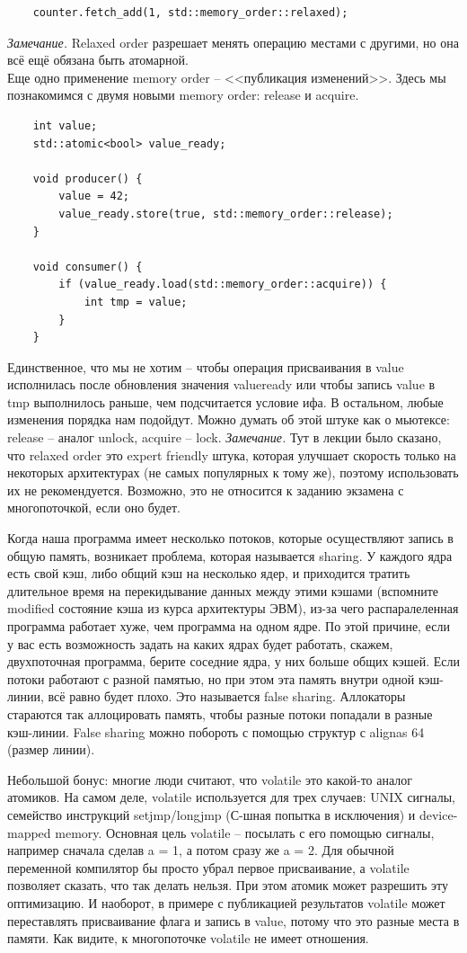 \documentclass[12pt, a4paper]{article}
\begin{document}
\begin{verbatim}
	counter.fetch_add(1, std::memory_order::relaxed);
\end{verbatim}
\textit{Замечание.} Relaxed order разрешает менять операцию местами с другими, но она всё ещё обязана быть атомарной.\\
Еще одно применение memory order -- <<публикация изменений>>. Здесь мы познакомимся с двумя новыми memory order: release и acquire.
\begin{verbatim}
	int value;
	std::atomic<bool> value_ready;
	
	void producer() {
		value = 42;
		value_ready.store(true, std::memory_order::release);
	} 
	
	void consumer() {
		if (value_ready.load(std::memory_order::acquire)) {
			int tmp = value;
		}
	}
\end{verbatim}
Единственное, что мы не хотим -- чтобы операция присваивания в value исполнилась после обновления значения value\textunderscore ready или чтобы запись value в tmp выполнилось раньше, чем подсчитается условие ифа. В остальном, любые изменения порядка нам подойдут. Можно думать об этой штуке как о мьютексе: release -- аналог unlock, acquire -- lock.
\textit{Замечание.} Тут в лекции было сказано, что relaxed order это expert friendly штука, которая улучшает скорость только на некоторых архитектурах (не самых популярных к тому же), поэтому использовать их не рекомендуется. Возможно, это не относится к заданию экзамена с многопоточкой, если оно будет.\\
\par Когда наша программа имеет несколько потоков, которые осуществляют запись в общую память, возникает проблема, которая называется sharing. У каждого ядра есть свой кэш, либо общий кэш на несколько ядер, и приходится тратить длительное время на перекидывание данных между этими кэшами (вспомните modified состояние кэша из курса архитектуры ЭВМ), из-за чего распаралеленная программа работает хуже, чем программа на одном ядре. По этой причине, если у вас есть возможность задать на каких ядрах будет работать, скажем, двухпоточная программа, берите соседние ядра, у них больше общих кэшей. Если потоки работают с разной памятью, но при этом эта память внутри одной кэш-линии, всё равно будет плохо. Это называется false sharing. Аллокаторы стараются так аллоцировать память, чтобы разные потоки попадали в разные кэш-линии. False sharing можно побороть с помощью структур с alignas 64 (размер линии).\\
\par Небольшой бонус: многие люди считают, что volatile это какой-то аналог атомиков. На самом деле, volatile используется для трех случаев: UNIX сигналы, семейство инструкций setjmp/longjmp (С-шная попытка в исключения) и device-mapped memory. Основная цель volatile -- посылать с его помощью сигналы, например сначала сделав a = 1, а потом сразу же a = 2. Для обычной переменной компилятор бы просто убрал первое присваивание, а volatile позволяет сказать, что так делать нельзя. При этом атомик может разрешить эту оптимизацию. И наоборот, в примере с публикацией результатов volatile может переставлять присваивание флага и запись в value, потому что это разные места в памяти. Как видите, к многопоточке volatile не имеет отношения.
\end{document}
